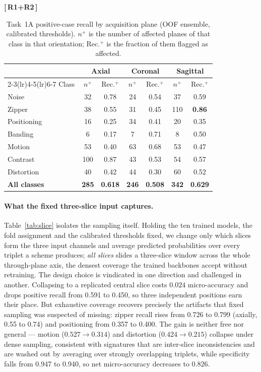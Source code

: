 \documentclass[runningheads]{llncs}
\newenvironment{revblock}[2]{\par\color{#1}\noindent\textbf{[\,#2\,]}\ \ignorespaces}{\par}
\begin{document}
\begin{revblock}{revboth}{R1+R2}
\begin{table}[!htbp]
\caption{Task~1A positive-case recall by acquisition plane (OOF ensemble, calibrated
thresholds). $n^{+}$ is the number of affected planes of that class in that
orientation; Rec.$^{+}$ is the fraction of them flagged as affected.}
\label{tab:plane}
\centering
\setlength{\tabcolsep}{5pt}
\footnotesize
\begin{tabular}{lcccccc}
\toprule
& \multicolumn{2}{c}{Axial} & \multicolumn{2}{c}{Coronal} & \multicolumn{2}{c}{Sagittal} \\
\cmidrule(lr){2-3}\cmidrule(lr){4-5}\cmidrule(lr){6-7}
Class & $n^{+}$ & Rec.$^{+}$ & $n^{+}$ & Rec.$^{+}$ & $n^{+}$ & Rec.$^{+}$ \\
\midrule
Noise       &  32 & 0.78 &  24 & 0.54 &  37 & 0.59 \\
Zipper      &  38 & 0.55 &  31 & 0.45 & 110 & \textbf{0.86} \\
Positioning &  16 & 0.25 &  34 & 0.41 &  20 & 0.35 \\
Banding     &   6 & 0.17 &   7 & 0.71 &   8 & 0.50 \\
Motion      &  53 & 0.40 &  63 & 0.68 &  53 & 0.47 \\
Contrast    & 100 & 0.87 &  43 & 0.53 &  54 & 0.57 \\
Distortion  &  40 & 0.42 &  44 & 0.30 &  60 & 0.52 \\
\midrule
\textbf{All classes} & \textbf{285} & \textbf{0.618} & \textbf{246} & \textbf{0.508}
  & \textbf{342} & \textbf{0.629} \\
\bottomrule
\end{tabular}
\end{table}

\paragraph{What the fixed three-slice input captures.}
Table~\ref{tab:slice} isolates the sampling itself. Holding the ten trained models,
the fold assignment and the calibrated thresholds fixed, we change only which slices
form the three input channels and average predicted probabilities over every triplet a
scheme produces; \emph{all slices} slides a three-slice window across the whole
through-plane axis, the densest coverage the trained backbones accept without
retraining. The design choice is vindicated in one direction and challenged in
another. Collapsing to a replicated central slice costs $0.024$ micro-accuracy and
drops positive recall from 0.591 to 0.450, so three independent positions earn their
place. But exhaustive coverage recovers precisely the artifacts that fixed sampling
was suspected of missing: zipper recall rises from 0.726 to 0.799 (axially, 0.55 to
0.74) and positioning from 0.357 to 0.400. The gain is neither free nor general ---
motion ($0.527\!\to\!0.314$) and distortion ($0.424\!\to\!0.215$) collapse under dense
sampling, consistent with signatures that are inter-slice inconsistencies and are
washed out by averaging over strongly overlapping triplets, while specificity falls
from 0.947 to 0.940, so net micro-accuracy decreases to 0.826.


\end{revblock}
\end{document}
